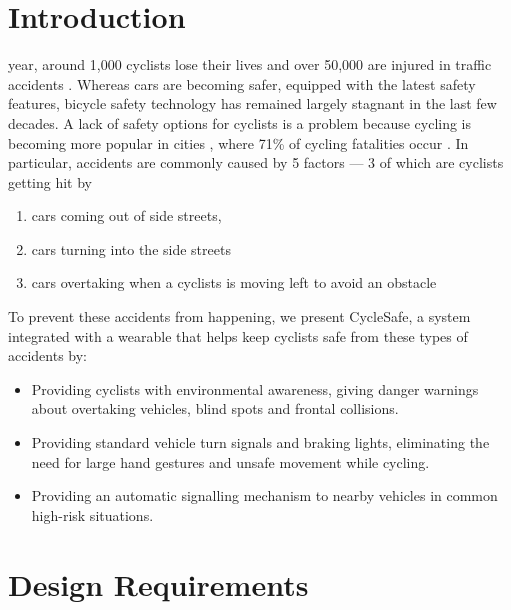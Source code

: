 \documentclass[journal]{IEEEtran}
\begin{document}
\section{Introduction}
% 
% 
 year, around 1,000 cyclists lose their lives and over 50,000 are injured in traffic accidents \cite{biking_death}. Whereas cars are becoming safer, equipped with the latest safety features, bicycle safety technology has remained largely stagnant in the last few decades. A lack of safety options for cyclists is a problem because cycling is becoming more popular in cities \cite{biking_popularity}, where 71\% of cycling fatalities occur \cite{biking_crashes}. In particular, accidents are commonly caused by 5 factors \cite{biking_cases} --- 3 of which are cyclists getting hit by 
\begin{enumerate}
    \item cars coming out of side streets, 
    \item cars turning into the side streets 
    \item cars overtaking when a cyclists is moving left to avoid an obstacle 
\end{enumerate}

To prevent these accidents from happening, we present CycleSafe, a system integrated with a wearable that helps keep cyclists safe from these types of accidents by:

\begin{itemize}
    \item Providing cyclists with environmental awareness, giving danger warnings about overtaking vehicles, blind spots and frontal collisions.
    \item Providing standard vehicle turn signals and braking lights, eliminating the need for large hand gestures and unsafe movement while cycling.
    \item Providing an automatic signalling mechanism to nearby vehicles in common high-risk situations.
\end{itemize}

\section{Design Requirements}
\end{document}
